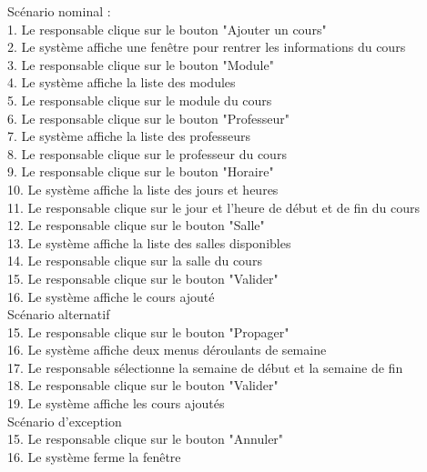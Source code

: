 \documentclass[a4paper,12pt]{article}
\begin{document}
Scénario nominal : \\
1. Le responsable clique sur le bouton "Ajouter un cours"\\
2. Le système affiche une fenêtre pour rentrer les informations du cours\\
3. Le responsable clique sur le bouton "Module"\\
4. Le système affiche la liste des modules\\
5. Le responsable clique sur le module du cours\\
6. Le responsable clique sur le bouton "Professeur"\\
7. Le système affiche la liste des professeurs\\
8. Le responsable clique sur le professeur du cours\\
9. Le responsable clique sur le bouton "Horaire"\\
10. Le système affiche la liste des jours et heures\\
11. Le responsable clique sur le jour et l'heure de début et de fin du cours\\
12. Le responsable clique sur le bouton "Salle"\\
13. Le système affiche la liste des salles disponibles\\
14. Le responsable clique sur la salle du cours\\
15. Le responsable clique sur le bouton "Valider"\\
16. Le système affiche le cours ajouté\\

Scénario alternatif\\
15. Le responsable clique sur le bouton "Propager"\\
16. Le système affiche deux menus déroulants de semaine\\
17. Le responsable sélectionne la semaine de début et la semaine de fin\\
18. Le responsable clique sur le bouton "Valider"\\
19. Le système affiche les cours ajoutés\\

Scénario d'exception\\
15. Le responsable clique sur le bouton "Annuler"\\
16. Le système ferme la fenêtre\\
\end{document}
